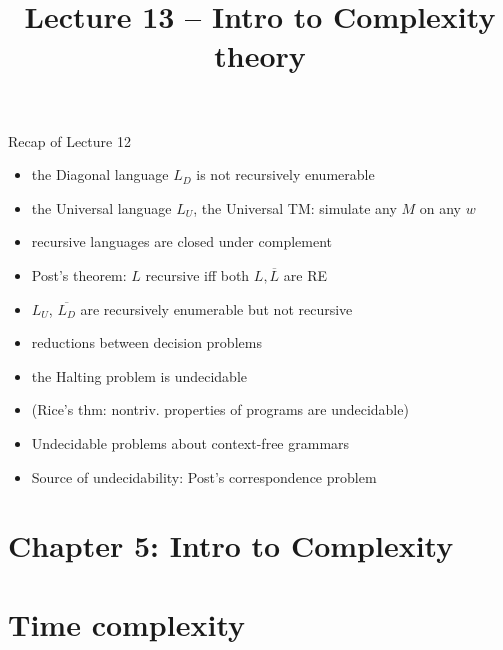 \documentclass[handout]{beamer}
\title{Lecture 13 -- Intro to Complexity theory}
\begin{document}
\frame{\titlepage}


\begin{frame}{Recap of Lecture 12}

    \begin{itemize}
        \item the Diagonal language $L_D$ is not recursively enumerable
        \item the Universal language $L_U$, the Universal TM: simulate any $M$ on any $w$
        \item recursive languages are closed under complement
        \item Post's theorem: $L$ recursive iff both $L,\overline{L}$ are RE
        \item $L_U$, $\overline{L_D}$ are recursively enumerable but not recursive
        \item reductions between decision problems
        \item the Halting problem is undecidable        
        \item (Rice's thm: nontriv. properties of programs are undecidable)
        \item Undecidable problems about context-free grammars
        \item Source of undecidability: Post's correspondence problem
    \end{itemize}

\end{frame}


\section{\sc Chapter 5: Intro to Complexity}


\section*{Time complexity}
\end{document}
